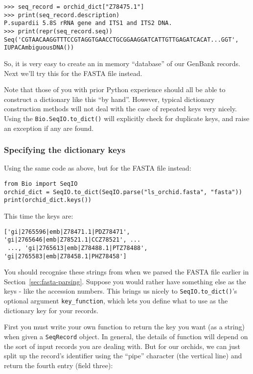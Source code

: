 \documentclass{report}
\begin{document}
\begin{verbatim}
>>> seq_record = orchid_dict["Z78475.1"]
>>> print(seq_record.description)
P.supardii 5.8S rRNA gene and ITS1 and ITS2 DNA.
>>> print(repr(seq_record.seq))
Seq('CGTAACAAGGTTTCCGTAGGTGAACCTGCGGAAGGATCATTGTTGAGATCACAT...GGT', IUPACAmbiguousDNA())
\end{verbatim}

So, it is very easy to create an in memory ``database'' of our GenBank records.  Next we'll try this for the FASTA file instead.

Note that those of you with prior Python experience should all be able to construct a dictionary like this ``by hand''.  However, typical dictionary construction methods will not deal with the case of repeated keys very nicely.  Using the \verb|Bio.SeqIO.to_dict()| will explicitly check for duplicate keys, and raise an exception if any are found.

\subsubsection{Specifying the dictionary keys}
\label{seq:seqio-todict-functionkey}

Using the same code as above, but for the FASTA file instead:

\begin{verbatim}
from Bio import SeqIO
orchid_dict = SeqIO.to_dict(SeqIO.parse("ls_orchid.fasta", "fasta"))
print(orchid_dict.keys())
\end{verbatim}

\noindent This time the keys are:

\begin{verbatim}
['gi|2765596|emb|Z78471.1|PDZ78471', 'gi|2765646|emb|Z78521.1|CCZ78521', ...
 ..., 'gi|2765613|emb|Z78488.1|PTZ78488', 'gi|2765583|emb|Z78458.1|PHZ78458']
\end{verbatim}

You should recognise these strings from when we parsed the FASTA file earlier in Section~\ref{sec:fasta-parsing}.  Suppose you would rather have something else as the keys - like the accession numbers.  This brings us nicely to \verb|SeqIO.to_dict()|'s optional argument \verb|key_function|, which lets you define what to use as the dictionary key for your records.

First you must write your own function to return the key you want (as a string) when given a \verb|SeqRecord| object.  In general, the details of function will depend on the sort of input records you are dealing with.  But for our orchids, we can just split up the record's identifier using the ``pipe'' character (the vertical line) and return the fourth entry (field three):
\end{document}
